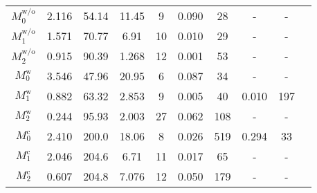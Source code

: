 \begin{table}
\begin{tabularx}{1\textwidth}{cCCCCCCCCC}
			$M_0^\mathrm{w/o}$&  2.116 &  54.14&    11.45&   9 & 0.090&  28&-&-\\
			$M_1^\mathrm{w/o}$& 1.571&   70.77&     6.91&  10 &0.010   &   29& -&-\\
			$M_2^\mathrm{w/o}$ &  0.915 &  90.39 &   1.268 & 12&0.001 & 53 & -&-\\ 
			
			\midrule
			
			
			$M_0^\mathrm{w}$& 3.546&   47.96&   20.95 &  6 &0.087&  34&     -&-\\
			$M_1^\mathrm{w}$& 0.882 &  63.32 &  2.853 &  9&0.005&  40 & 0.010&197\\
			$M_2^\mathrm{w}$ & 0.244&   95.93&   2.003&  27& 0.062 &  108    & -&-\\ 
			
			\midrule
			
			
		$M_0^\mathrm{c}$& 2.410&  200.0&   18.06&  8&0.026&   519  & 0.294&33\\
		$M_1^\mathrm{c}$& 2.046&   204.6&   6.71&  11 &0.017&   65&    -&-\\
		$M_2^\mathrm{c}$ & 0.607&   204.8&   7.076 &  12&0.050&  179    & -&-\\
			
		\bottomrule
	\end{tabularx}\label{tab:Arhenius}
\end{table}


\clearpage
